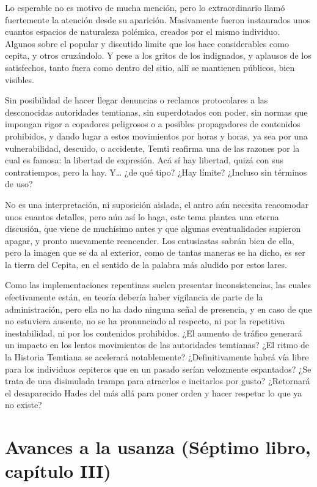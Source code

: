 \documentclass[
  spanish,
]{book}
\begin{document}
Lo esperable no es motivo de mucha mención, pero lo extraordinario llamó fuertemente la atención desde su aparición. Masivamente fueron instaurados unos cuantos espacios de naturaleza polémica, creados por el mismo individuo. Algunos sobre el popular y discutido limite que los hace considerables como cepita, y otros cruzándolo. Y pese a los gritos de los indignados, y aplausos de los satisfechos, tanto fuera como dentro del sitio, allí se mantienen públicos, bien visibles.

Sin posibilidad de hacer llegar denuncias o reclamos protocolares a las desconocidas autoridades temtianas, sin superdotados con poder, sin normas que impongan rigor a copadores peligrosos o a posibles propagadores de contenidos prohibidos, y dando lugar a estos movimientos por horas y horas, ya sea por una vulnerabilidad, descuido, o accidente, Temti reafirma una de las razones por la cual es famosa: la libertad de expresión. Acá sí hay libertad, quizá con sus contratiempos, pero la hay. Y\ldots{} ¿de qué tipo? ¿Hay límite? ¿Incluso sin términos de uso?

No es una interpretación, ni suposición aislada, el antro aún necesita reacomodar unos cuantos detalles, pero aún así lo haga, este tema plantea una eterna discusión, que viene de muchísimo antes y que algunas eventualidades supieron apagar, y pronto nuevamente reencender. Los entusiastas sabrán bien de ella, pero la imagen que se da al exterior, como de tantas maneras se ha dicho, es ser la tierra del Cepita, en el sentido de la palabra más aludido por estos lares.

Como las implementaciones repentinas suelen presentar inconsistencias, las cuales efectivamente están, en teoría debería haber vigilancia de parte de la administración, pero ella no ha dado ninguna señal de presencia, y en caso de que no estuviera ausente, no se ha pronunciado al respecto, ni por la repetitiva inestabilidad, ni por los contenidos prohibidos. ¿El aumento de tráfico generará un impacto en los lentos movimientos de las autoridades temtianas? ¿El ritmo de la Historia Temtiana se acelerará notablemente? ¿Definitivamente habrá vía libre para los individuos cepiteros que en un pasado serían velozmente espantados? ¿Se trata de una disimulada trampa para atraerlos e incitarlos por gusto? ¿Retornará el desaparecido Hades del más allá para poner orden y hacer respetar lo que ya no existe?

\hypertarget{avances-a-la-usanza-suxe9ptimo-libro-capuxedtulo-iii}{%
\section{Avances a la usanza (Séptimo libro, capítulo III)}\label{avances-a-la-usanza-suxe9ptimo-libro-capuxedtulo-iii}}
\end{document}

